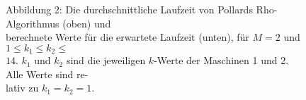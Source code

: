\documentclass[a3paper,extrafontsizes,20pt, ngerman]{memoir}
\begin{document}
\begin{figure}
    \vspace{1em}
    Abbildung 2: Die durchschnittliche Laufzeit von Pollards Rho-Algorithmus (oben) und \\ berechnete Werte für die erwartete Laufzeit (unten), für $M = 2$ und $1 \le k_1 \le k_2 \le $ \\ $ 14$. $k_1$ und $k_2$ sind die jeweiligen $k$-Werte der Maschinen 1 und 2. Alle Werte sind re-\\lativ zu  $k_1 = k_2 = 1$.

\end{figure}
\end{document}
